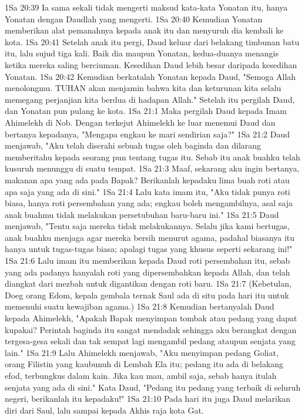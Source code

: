 1Sa 20:39  Ia sama sekali tidak mengerti maksud kata-kata Yonatan itu, hanya Yonatan dengan Daudlah yang mengerti.
1Sa 20:40  Kemudian Yonatan memberikan alat pemanahnya kepada anak itu dan menyuruh dia kembali ke kota.
1Sa 20:41  Setelah anak itu pergi, Daud keluar dari belakang timbunan batu itu, lalu sujud tiga kali. Baik dia maupun Yonatan, kedua-duanya menangis ketika mereka saling berciuman. Kesedihan Daud lebih besar daripada kesedihan Yonatan.
1Sa 20:42  Kemudian berkatalah Yonatan kepada Daud, "Semoga Allah menolongmu. TUHAN akan menjamin bahwa kita dan keturunan kita selalu memegang perjanjian kita berdua di hadapan Allah." Setelah itu pergilah Daud, dan Yonatan pun pulang ke kota.
1Sa 21:1  Maka pergilah Daud kepada Imam Ahimelekh di Nob. Dengan terkejut Ahimelekh ke luar menemui Daud dan bertanya kepadanya, "Mengapa engkau ke mari sendirian saja?"
1Sa 21:2  Daud menjawab, "Aku telah diserahi sebuah tugas oleh baginda dan dilarang memberitahu kepada seorang pun tentang tugas itu. Sebab itu anak buahku telah kusuruh menunggu di suatu tempat.
1Sa 21:3  Maaf, sekarang aku ingin bertanya, makanan apa yang ada pada Bapak? Berikanlah kepadaku lima buah roti atau apa saja yang ada di sini."
1Sa 21:4  Lalu kata imam itu, "Aku tidak punya roti biasa, hanya roti persembahan yang ada; engkau boleh mengambilnya, asal saja anak buahmu tidak melakukan persetubuhan baru-baru ini."
1Sa 21:5  Daud menjawab, "Tentu saja mereka tidak melakukannya. Selalu jika kami bertugas, anak buahku menjaga agar mereka bersih menurut agama, padahal biasanya itu hanya untuk tugas-tugas biasa; apalagi tugas yang khusus seperti sekarang ini!"
1Sa 21:6  Lalu imam itu memberikan kepada Daud roti persembahan itu, sebab yang ada padanya hanyalah roti yang dipersembahkan kepada Allah, dan telah diangkat dari mezbah untuk digantikan dengan roti baru.
1Sa 21:7  (Kebetulan, Doeg orang Edom, kepala gembala ternak Saul ada di situ pada hari itu untuk memenuhi suatu kewajiban agama.)
1Sa 21:8  Kemudian bertanyalah Daud kepada Ahimelekh, "Apakah Bapak menyimpan tombak atau pedang yang dapat kupakai? Perintah baginda itu sangat mendadak sehingga aku berangkat dengan tergesa-gesa sekali dan tak sempat lagi mengambil pedang ataupun senjata yang lain."
1Sa 21:9  Lalu Ahimelekh menjawab, "Aku menyimpan pedang Goliat, orang Filistin yang kaubunuh di Lembah Ela itu; pedang itu ada di belakang efod, terbungkus dalam kain. Jika kau mau, ambil saja, sebab hanya itulah senjata yang ada di sini." Kata Daud, "Pedang itu pedang yang terbaik di seluruh negeri, berikanlah itu kepadaku!"
1Sa 21:10  Pada hari itu juga Daud melarikan diri dari Saul, lalu sampai kepada Akhis raja kota Gat.
